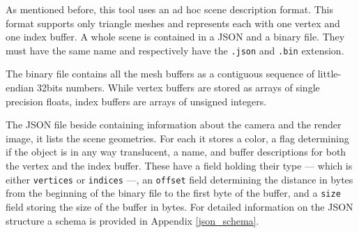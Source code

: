 As mentioned before, this tool uses an ad hoc scene description format. This format supports only triangle meshes and represents each with one vertex and one index buffer. A whole scene is contained in a JSON \cite{rfc8259} and a binary file. They must have the same name and respectively have the \texttt{.json} and \texttt{.bin} extension. 

The binary file contains all the mesh buffers as a contiguous sequence of little-endian 32bits numbers. While vertex buffers are stored as arrays of single precision floats, index buffers are arrays of unsigned integers. 

The JSON file beside containing information about the camera and the render image, it lists the scene geometries. For each it stores a color, a flag determining if the object is in any way translucent, a name, and buffer descriptions for both the vertex and the index buffer. These have a field holding their type --- which is either \texttt{vertices} or \texttt{indices} ---, an \texttt{offset} field determining the distance in bytes from the beginning of the binary file to the first byte of the buffer, and a \texttt{size} field storing the size of the buffer in bytes. For detailed information on the JSON structure a schema is provided in Appendix \ref{json_schema}.

